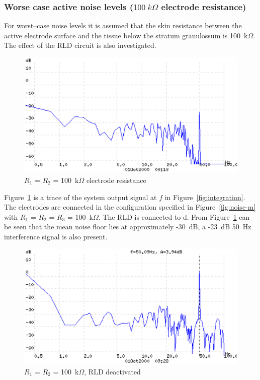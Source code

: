 \subsubsection{Worse case active noise levels ($100~k\Omega$ electrode resistance)}
For worst--case noise levels it is assumed that the skin resistance
between the active electrode surface and the tissue below the stratum
granulossum is 100~k$\Omega$. The effect of the RLD circuit is also
investigated.


\begin{figure}[htbp]
\begin{center}
	\includegraphics[width=\textwidth]{N2ON100K.ps}
    \caption{$R_1$ = $R_2$ = 100~k$\Omega$ electrode resistance}
    \label{fig:N2ON100K}
\end{center}
\end{figure}

Figure~\ref{fig:N2ON100K} is a trace of the system output signal at
$f$ in Figure~\ref{fig:integration}. The electrodes are connected in
the configuration specified in Figure~\ref{fig:noise-m} with $R_1$ =
$R_2$ = $R_3$ = 100~k$\Omega$. The RLD is connected to d. From
Figure~\ref{fig:N2ON100K} can be seen that the mean noise floor lies
at approximately -30~dB, a -23~dB 50~Hz interference signal is also
present. 


\begin{figure}[htbp]
\begin{center}
	\includegraphics[width=\textwidth]{N3NRLD1.ps}
    \caption{$R_1$ = $R_2$ = 100~k$\Omega$, RLD deactivated}
    \label{fig:N3NRLD1}
\end{center}
\end{figure}

